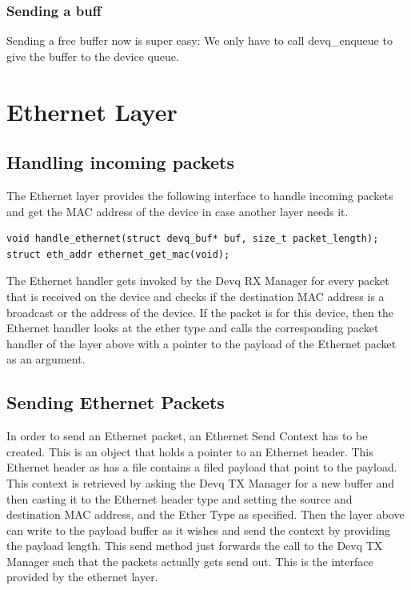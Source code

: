 \subsubsection{Sending a buff}

Sending a free buffer now is super easy: We only have to call devq\_enqueue to give the buffer to the device queue.


\section{Ethernet Layer}

\subsection{Handling incoming packets}
The Ethernet layer provides the following interface to handle incoming packets and get the MAC address of the device in case another layer needs it.
\begin{verbatim}
void handle_ethernet(struct devq_buf* buf, size_t packet_length);
struct eth_addr ethernet_get_mac(void);
\end{verbatim}
The Ethernet handler gets invoked by the Devq RX Manager for every packet that is received on the device and checks if the destination MAC address is a broadcast or the address of the device. If the packet is for this device, then the Ethernet handler looks at the ether type and calls the corresponding packet handler of the layer above with a pointer to the payload of the Ethernet packet as an argument.

\subsection{Sending Ethernet Packets}

In order to send an Ethernet packet, an Ethernet Send Context has to be created.
This is an object that holds a pointer to an Ethernet header. This Ethernet header as has a file contains a filed payload that point to the payload.
This context is retrieved by asking the Devq TX Manager for a new buffer and then casting it to the Ethernet header type and setting the source and destination MAC address, and the Ether Type as specified.
Then the layer above can write to the payload buffer as it wishes and send the context by providing the payload length. This send method just forwards the call to the Devq TX Manager such that the packets actually gets send out. This is the interface provided by the ethernet layer.

